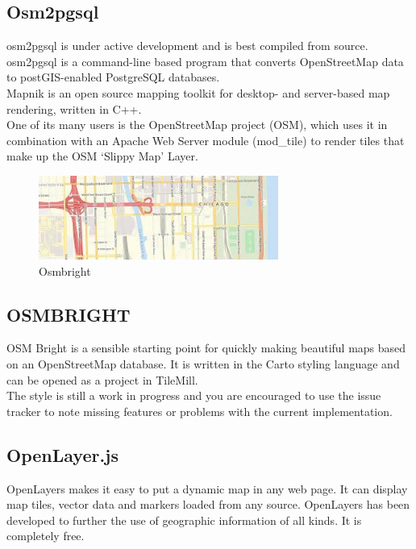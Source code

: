 \subsection{Osm2pgsql}
 osm2pgsql is under active development and is best compiled from source.\\
osm2pgsql is a command-line based program that converts OpenStreetMap data to postGIS-enabled PostgreSQL databases.\\
Mapnik is an open source mapping toolkit for desktop- and server-based map rendering, written in C++.\\
One of its many users is the OpenStreetMap project (OSM), which uses it in combination with an Apache Web Server module (mod\_tile) to render tiles that make up the OSM ‘Slippy Map’ Layer.\\
\begin{figure}[!ht]
\centering
\includegraphics[width=0.7\textwidth]{input/images/bright.jpeg}                   
\caption{Osmbright}
\hspace{-1.5em}
\end{figure}



\subsection{OSMBRIGHT}
OSM Bright is a sensible starting point for quickly making beautiful maps based on an OpenStreetMap database. It is written in the Carto styling language and can be opened as a project in TileMill.\\
The style is still a work in progress and you are encouraged to use the issue tracker to note missing features or problems with the current implementation.\\
\subsection{OpenLayer.js}
OpenLayers makes it easy to put a dynamic map in any web page. It can display map tiles, vector data and markers loaded from any source. OpenLayers has been developed to further the use of geographic information of all kinds. It is completely free.\\
